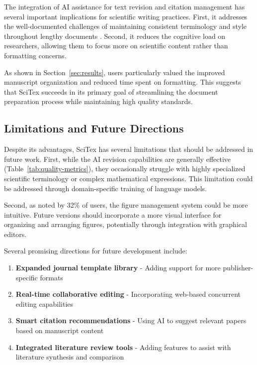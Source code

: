 \documentclass[preprint,review,12pt]{elsarticle}\n
\begin{document}
The integration of AI assistance for text revision and citation management has several important implications for scientific writing practices. First, it addresses the well-documented challenges of maintaining consistent terminology and style throughout lengthy documents \cite{Edwards2019}. Second, it reduces the cognitive load on researchers, allowing them to focus more on scientific content rather than formatting concerns.

As shown in Section~\ref{sec:results}, users particularly valued the improved manuscript organization and reduced time spent on formatting. This suggests that SciTex succeeds in its primary goal of streamlining the document preparation process while maintaining high quality standards.


\subsection{Limitations and Future Directions}
\label{subsec:limitations}

Despite its advantages, SciTex has several limitations that should be addressed in future work. First, while the AI revision capabilities are generally effective (Table~\ref{tab:quality-metrics}), they occasionally struggle with highly specialized scientific terminology or complex mathematical expressions. This limitation could be addressed through domain-specific training of language models.

Second, as noted by 32\% of users, the figure management system could be more intuitive. Future versions should incorporate a more visual interface for organizing and arranging figures, potentially through integration with graphical editors.


Several promising directions for future development include:

\begin{enumerate}
    \item \textbf{Expanded journal template library} - Adding support for more publisher-specific formats
    \item \textbf{Real-time collaborative editing} - Incorporating web-based concurrent editing capabilities
    \item \textbf{Smart citation recommendations} - Using AI to suggest relevant papers based on manuscript content
    \item \textbf{Integrated literature review tools} - Adding features to assist with literature synthesis and comparison
\end{enumerate}
\end{document}
